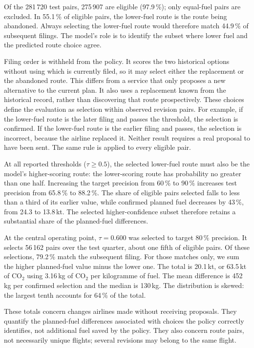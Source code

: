 \documentclass[preprint,authoryear,12pt]{elsarticle}
\begin{document}
Of the 281\,720 test pairs, 275\,907 are eligible (97.9\,\%);
only equal-fuel pairs are excluded. In 55.1\,\% of eligible pairs,
the lower-fuel route is the route being abandoned. Always selecting
the lower-fuel route would therefore match 44.9\,\% of subsequent
filings. The model's role is to identify the subset where lower fuel
and the predicted route choice agree.

Filing order is withheld from the policy. It scores the two historical
options without using which is currently filed, so it may select either
the replacement or the abandoned route. This differs from a service
that only proposes a new alternative to the current plan. It also uses
a replacement known from the historical record, rather than discovering
that route prospectively. These choices define the evaluation as selection within observed revision
pairs. For example, if the lower-fuel route is the later filing and passes
the threshold, the selection is confirmed. If the lower-fuel route is
the earlier filing and passes, the selection is incorrect, because the
airline replaced it. Neither result requires a real proposal to have
been sent. The same rule is applied to every eligible pair.

At all reported thresholds ($\tau\geq0.5$), the selected lower-fuel
route must also be the model's higher-scoring route: the lower-scoring
route has probability no greater than one half. Increasing the target
precision from 60\,\% to 90\,\% increases test precision from
65.8\,\% to 88.2\,\%. The share of eligible pairs selected falls
to less than a third of its earlier value, while confirmed planned
fuel decreases by 43\,\%, from 24.3 to 13.8\,kt. The selected
higher-confidence subset therefore retains a substantial share of the
planned-fuel differences.

At the central operating point, $\tau=0.600$ was selected to target
80\,\% precision. It selects 56\,162 pairs over the test quarter,
about one fifth of eligible pairs. Of these selections, 79.2\,\%
match the subsequent filing. For those matches only, we sum the higher
planned-fuel value minus the lower one. The total is 20.1\,kt, or
63.5\,kt of CO$_2$ using 3.16\,kg of CO$_2$ per kilogramme of fuel.
The mean difference is 452\,kg per confirmed selection and the median
is 130\,kg. The distribution is skewed: the largest tenth accounts
for 64\,\% of the total.

These totals concern changes airlines made without receiving proposals.
They quantify the planned-fuel differences associated with choices the
policy correctly identifies, not additional fuel saved by the policy.
They also concern route pairs, not necessarily unique flights; several
revisions may belong to the same flight.
\end{document}
